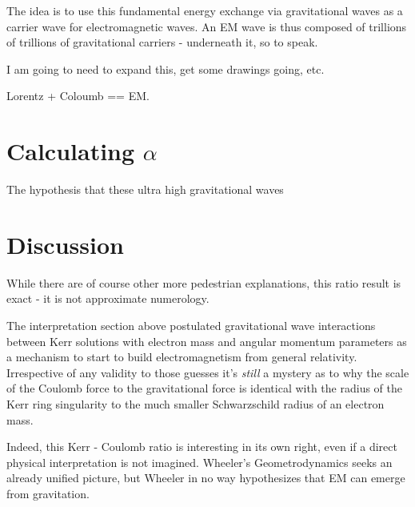 \documentclass[../rzero]{subfiles}
\begin{document}
 The idea is to use this fundamental energy exchange via gravitational waves as a carrier wave for electromagnetic waves. An EM wave is thus composed of trillions of trillions of gravitational carriers - underneath it, so to speak. 
 
 I am going to need to expand this, get some drawings going, etc. 
  
  Lorentz + Coloumb == EM. 

 \section{Calculating \texorpdfstring{$ \alpha $}{Alpha}} 
 The hypothesis that these ultra high gravitational waves 

\section{Discussion}
While there are of course other more pedestrian explanations, this ratio result is exact - it is not approximate numerology.

The interpretation section above postulated gravitational wave interactions between Kerr solutions with electron mass and angular momentum parameters as a mechanism to start to build electromagnetism from general relativity. Irrespective of any validity to those guesses it's \textit{still} a mystery as to why the scale of the Coulomb force to the gravitational force is identical with the radius of the Kerr ring singularity to the much smaller Schwarzschild radius of an electron mass.

Indeed, this Kerr - Coulomb ratio is interesting in its own right, even if a direct physical interpretation is not imagined. Wheeler's Geometrodynamics \cite{Wheeler1957a} seeks an already unified picture, but Wheeler in no way hypothesizes that EM can emerge from gravitation. 
\end{document}
